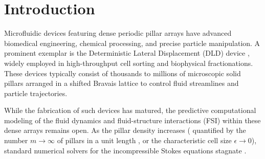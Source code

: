 \documentclass{elsarticle}
\begin{document}
\begin{frontmatter}
    \begin{abstract}
        The predictive simulation of fluid dynamics in densely packed microfluidic devices, such as Deterministic Lateral Displacement (DLD) arrays, stagnates with standard iterative solvers. We show that this failure is not algorithmic but rooted in the pre-asymptotic degradation of the pressure-velocity coupling stability. For periodic pillar geometries in a generalized lattice framework, we prove that the continuous Ladyzhenskaya-Babuška-Brezzi (LBB) condition, also called the inf-sup constant, deteriorates exactly as $m^{-1}$ up to a positive multiplicative constant, where $m$ is the pillar density (the number of pillars per unit length). This induces a priori error amplification proportional to $m$ and a pressure Schur complement condition number scaling as $\mathcal{O}(m^2)$. To overcome this theoretical limit, we propose a parameter-free, adaptively scaled Augmented Lagrangian (AL) stabilization strategy with penalty $\gamma \propto m^2$. Numerical experiments on both standard square and asymmetric DLD arrays validate the theoretical bounds: the AL method reduces outer FGMRES iterations from 437 to 22 on a 1.85M-DoF square array and from 687 to 24 on a 1.77M-DoF DLD array.
    \end{abstract}
\end{frontmatter}


\section{Introduction}\label{sec:intro}

Microfluidic devices featuring dense periodic pillar arrays have advanced biomedical engineering, chemical processing, and precise particle manipulation. A prominent exemplar is the Deterministic Lateral Displacement (DLD) device \cite{huang2004continuous, McGrath2014, Inglis2006, Dincau2018}, widely employed in high-throughput cell sorting and biophysical fractionations. These devices typically consist of thousands to millions of microscopic solid pillars arranged in a shifted Bravais lattice to control fluid streamlines and particle trajectories.

While the fabrication of such devices has matured, the predictive computational modeling of the fluid dynamics and fluid-structure interactions (FSI) within these dense arrays remains open. As the pillar density increases ( quantified by the number $m\to \infty$ of pillars in a unit length , or the characteristic cell size $\epsilon \to 0$), standard numerical solvers for the incompressible Stokes equations stagnate \cite{Meier2022}.
\end{document}
